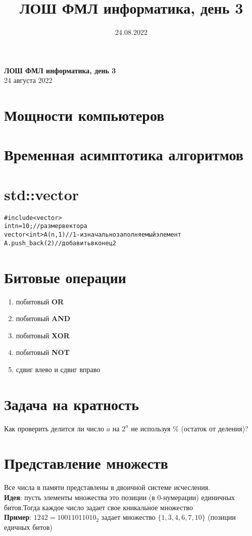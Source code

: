 \documentclass[10pt]{article}
\title{ЛОШ ФМЛ информатика, день 3}
\date{24.08.2022}
\begin{document}
\begin{center}
    \Large
    \textbf{ЛОШ ФМЛ информатика, день 3}
    \vspace{0.4cm}
    \large
    \\
    24 августа 2022
\end{center}
    \section{Мощности компьютеров}
    \section{Временная асимптотика алгоритмов}
    \section{std::vector}
    \begin{alltt}
#include<vector>
int n = 10; // размер вектора
vector<int> A(n , 1) // 1 - изначально заполняемый элемент
A.push_back(2) // добавить в конец 2
    \end{alltt}
    \section{Битовые операции}
        \begin{enumerate} 
            \item побитовый \textbf{OR} 
            \item  побитовый \textbf{AND} 
            \item  побитовый \textbf{XOR}
            \item  побитовый \textbf{NOT}
            \item  сдвиг влево и сдвиг вправо
        \end{enumerate}
    \section{Задача на кратность}
    Как проверить делится ли число $a$ на $2^n$ не используя $\%$ (остаток от деления)?
    \\ 
    \section{Представление множеств}
    Все числа в памяти представлены в двоичной системе исчесления.
    \\
    \textbf{Идея}: пусть элементы множества это позиции (в 0-нумерации) единичных битов.Тогда каждое число задает свое кникальное множество
    \\
    \textbf{Пример}: $1242 = 10011011010_2$ задает множество $\{1 , 3 , 4 , 6 , 7 , 10\}$ (позиции едичных битов)
\end{document}
